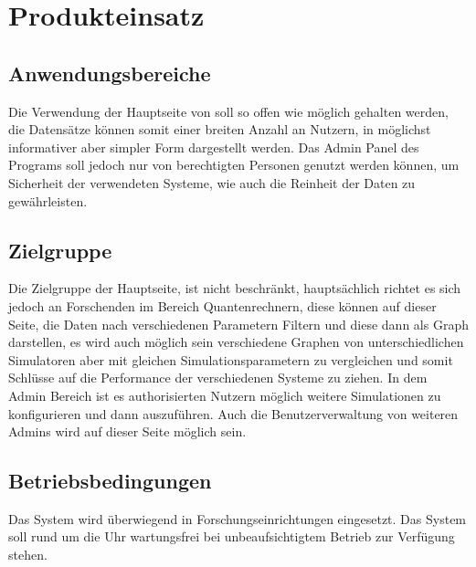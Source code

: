 \section{Produkteinsatz}
\subsection{Anwendungsbereiche}
Die  Verwendung der Hauptseite von \name soll so offen wie möglich gehalten werden, die Datensätze können somit einer breiten Anzahl an Nutzern, in möglichst informativer aber simpler Form dargestellt werden. Das Admin Panel des Programs soll jedoch nur von berechtigten Personen genutzt werden können, um Sicherheit der verwendeten Systeme, wie auch die Reinheit der Daten zu gewährleisten.

\subsection{Zielgruppe}
Die Zielgruppe der Hauptseite, ist nicht beschränkt, hauptsächlich richtet es sich jedoch an Forschenden im Bereich Quantenrechnern, diese können auf dieser Seite, die Daten nach verschiedenen Parametern Filtern und diese dann als Graph darstellen, es wird auch möglich sein verschiedene Graphen von unterschiedlichen Simulatoren aber mit gleichen Simulationsparametern zu vergleichen und somit Schlüsse auf die Performance der verschiedenen Systeme zu ziehen. In dem Admin Bereich ist es authorisierten Nutzern möglich weitere Simulationen zu konfigurieren und dann auszuführen. Auch die Benutzerverwaltung von weiteren Admins wird auf dieser Seite möglich sein.  

\subsection{Betriebsbedingungen}
Das \gls{System} wird überwiegend in Forschungseinrichtungen eingesetzt. Das System soll rund um die Uhr wartungsfrei bei unbeaufsichtigtem Betrieb zur Verfügung stehen.
